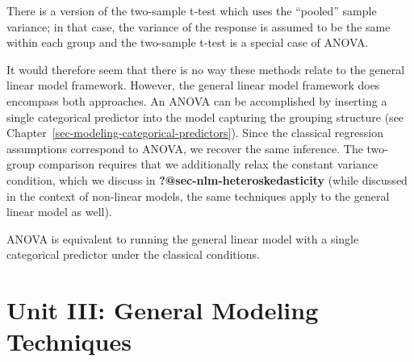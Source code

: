 \documentclass[
  letterpaper,
  DIV=11,
  numbers=noendperiod]{scrreprt}
\theoremstyle{definition}
\theoremstyle{definition}
\theoremstyle{remark}
\begin{document}
\begin{tcolorbox}[enhanced jigsaw, bottomrule=.15mm, titlerule=0mm, bottomtitle=1mm, colback=white, coltitle=black, rightrule=.15mm, leftrule=.75mm, toprule=.15mm, toptitle=1mm, left=2mm, opacityback=0, colframe=quarto-callout-note-color-frame, breakable, title=\textcolor{quarto-callout-note-color}{\faInfo}\hspace{0.5em}{Note}, arc=.35mm, colbacktitle=quarto-callout-note-color!10!white, opacitybacktitle=0.6]

There is a version of the two-sample t-test which uses the ``pooled''
sample variance; in that case, the variance of the response is assumed
to be the same within each group and the two-sample t-test is a special
case of ANOVA.

\end{tcolorbox}

It would therefore seem that there is no way these methods relate to the
general linear model framework. However, the general linear model
framework does encompass both approaches. An ANOVA can be accomplished
by inserting a single categorical predictor into the model capturing the
grouping structure (see
Chapter~\ref{sec-modeling-categorical-predictors}). Since the classical
regression assumptions correspond to ANOVA, we recover the same
inference. The two-group comparison requires that we additionally relax
the constant variance condition, which we discuss in
\textbf{?@sec-nlm-heteroskedasticity} (while discussed in the context of
non-linear models, the same techniques apply to the general linear model
as well).

\begin{tcolorbox}[enhanced jigsaw, bottomrule=.15mm, titlerule=0mm, bottomtitle=1mm, colback=white, coltitle=black, rightrule=.15mm, leftrule=.75mm, toprule=.15mm, toptitle=1mm, left=2mm, opacityback=0, colframe=quarto-callout-tip-color-frame, breakable, title=\textcolor{quarto-callout-tip-color}{\faLightbulb}\hspace{0.5em}{Big Idea}, arc=.35mm, colbacktitle=quarto-callout-tip-color!10!white, opacitybacktitle=0.6]

ANOVA is equivalent to running the general linear model with a single
categorical predictor under the classical conditions.

\end{tcolorbox}

\part{Unit III: General Modeling Techniques}
\end{document}
